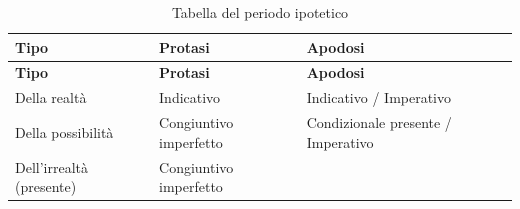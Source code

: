 \documentclass[
  a4paper,
  twoside,
  11pt,
  chapterprefix=false,
  bibliography=totocnumbered,
  listof=flat]{scrbook}
\begin{document}
\begin{longtable}[]{@{}lll@{}}
\caption{Tabella del periodo ipotetico}\tabularnewline
\toprule
\begin{minipage}[b]{0.28\columnwidth}\raggedright
\textbf{Tipo}\strut
\end{minipage} & \begin{minipage}[b]{0.25\columnwidth}\raggedright
\textbf{Protasi}\strut
\end{minipage} & \begin{minipage}[b]{0.38\columnwidth}\raggedright
\textbf{Apodosi}\strut
\end{minipage}\tabularnewline
\midrule
\endfirsthead
\toprule
\begin{minipage}[b]{0.28\columnwidth}\raggedright
\textbf{Tipo}\strut
\end{minipage} & \begin{minipage}[b]{0.25\columnwidth}\raggedright
\textbf{Protasi}\strut
\end{minipage} & \begin{minipage}[b]{0.38\columnwidth}\raggedright
\textbf{Apodosi}\strut
\end{minipage}\tabularnewline
\midrule
\endhead
\begin{minipage}[t]{0.28\columnwidth}\raggedright
Della realtà\strut
\end{minipage} & \begin{minipage}[t]{0.25\columnwidth}\raggedright
Indicativo\strut
\end{minipage} & \begin{minipage}[t]{0.38\columnwidth}\raggedright
Indicativo / Imperativo\strut
\end{minipage}\tabularnewline
\begin{minipage}[t]{0.28\columnwidth}\raggedright
Della possibilità\strut
\end{minipage} & \begin{minipage}[t]{0.25\columnwidth}\raggedright
Congiuntivo imperfetto\strut
\end{minipage} & \begin{minipage}[t]{0.38\columnwidth}\raggedright
Condizionale presente / Imperativo\strut
\end{minipage}\tabularnewline
\begin{minipage}[t]{0.28\columnwidth}\raggedright
Dell'irrealtà (presente)\strut
\end{minipage} & \begin{minipage}[t]{0.25\columnwidth}\raggedright
Congiuntivo imperfetto\strut
\end{minipage} & \begin{minipage}[t]{0.38\columnwidth}\raggedright

\end{minipage}
\end{longtable}
\end{document}
